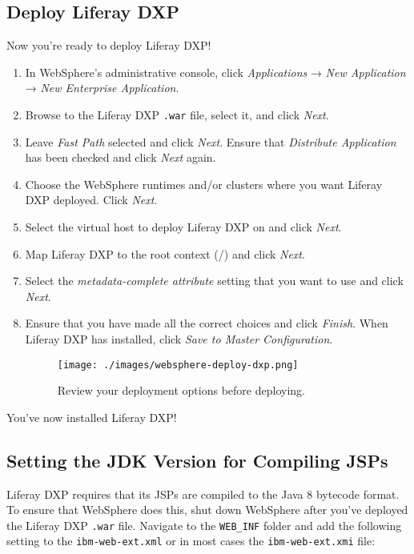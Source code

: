 \subsection{Deploy Liferay DXP}\label{deploy-liferay-dxp}

Now you're ready to deploy Liferay DXP!

\begin{enumerate}
\def\labelenumi{\arabic{enumi}.}
\item
  In WebSphere's administrative console, click \emph{Applications} →
  \emph{New Application} → \emph{New Enterprise Application}.
\item
  Browse to the Liferay DXP \texttt{.war} file, select it, and click
  \emph{Next}.
\item
  Leave \emph{Fast Path} selected and click \emph{Next}. Ensure that
  \emph{Distribute Application} has been checked and click \emph{Next}
  again.
\item
  Choose the WebSphere runtimes and/or clusters where you want Liferay
  DXP deployed. Click \emph{Next}.
\item
  Select the virtual host to deploy Liferay DXP on and click
  \emph{Next}.
\item
  Map Liferay DXP to the root context (/) and click \emph{Next}.
\item
  Select the \emph{metadata-complete attribute} setting that you want to
  use and click \emph{Next}.
\item
  Ensure that you have made all the correct choices and click
  \emph{Finish}. When Liferay DXP has installed, click \emph{Save to
  Master Configuration}.

  \begin{figure}
  \centering
  \texttt{[image: ./images/websphere-deploy-dxp.png]}
  \caption{Review your deployment options before deploying.}
  \end{figure}
\end{enumerate}

You've now installed Liferay DXP!

\subsection{Setting the JDK Version for Compiling
JSPs}\label{setting-the-jdk-version-for-compiling-jsps}

Liferay DXP requires that its JSPs are compiled to the Java 8 bytecode
format. To ensure that WebSphere does this, shut down WebSphere after
you've deployed the Liferay DXP \texttt{.war} file. Navigate to the
\texttt{WEB\_INF} folder and add the following setting to the
\texttt{ibm-web-ext.xml} or in most cases the \texttt{ibm-web-ext.xmi}
file:

